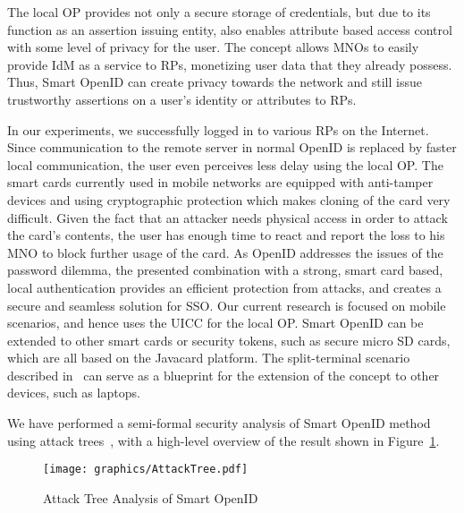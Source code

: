 \documentclass[runningheads,a4paper]{llncs}
\begin{document}
The local OP provides not only a secure storage of credentials, but due to its function as an assertion issuing entity, also enables attribute based access control with some level of privacy for the user.
The concept allows MNOs to easily provide IdM as a service to RPs, monetizing user data that they already possess. Thus, Smart OpenID can create privacy towards the network and still issue trustworthy assertions on a user's identity or attributes to RPs.

In our experiments, we successfully logged in to various RPs on the Internet. Since communication to the remote server in normal OpenID is replaced by faster local communication, the user even perceives less delay using the local OP. 
The smart cards currently used in mobile networks are equipped with anti-tamper devices and using cryptographic protection which makes cloning of the card very difficult.
Given the fact that an attacker needs physical access in order to attack the card's contents, the user has enough time to react and report the loss to his MNO to block further usage of the card.
As OpenID addresses the issues of the password dilemma, the presented combination with a strong, smart card based, local authentication provides an efficient protection from attacks, and creates a secure and seamless solution for SSO.
Our current research is focused on mobile scenarios, and hence uses the UICC for the local OP. Smart OpenID can be extended to other smart cards or security tokens, such as secure micro SD cards, which are all based on the Javacard platform.
The split-terminal scenario described in~\cite{3gpp.33.924} can serve as a blueprint for the extension of the concept to other devices, such as laptops.

We have performed a semi-formal security analysis of Smart OpenID method using attack trees~\cite{Mauw2005}, with a high-level overview of the result shown in Figure~\ref{fig:AttackTree}. 
\begin{figure}[t]
	\centering
		\texttt{[image: graphics/AttackTree.pdf]}
	\caption{Attack Tree Analysis of Smart OpenID}
	\label{fig:AttackTree}
\end{figure}
\end{document}
